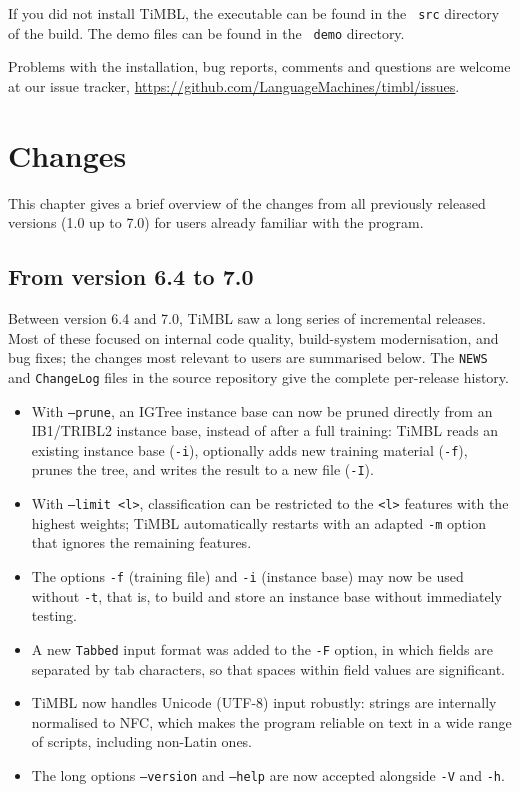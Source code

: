 \documentclass{book}
\begin{document}
If you did not install TiMBL, the executable can be found in the {\tt
  src} directory of the build. The demo files can be found in the {\tt
  demo} directory.

Problems with the installation, bug reports, comments and questions
are welcome at our issue tracker,
\url{https://github.com/LanguageMachines/timbl/issues}.

\chapter{Changes}
\label{changes}

This chapter gives a brief overview of the changes from all previously
released versions (1.0 up to 7.0) for users already familiar with the
program.

\section{From version 6.4 to 7.0}

Between version 6.4 and 7.0, TiMBL saw a long series of incremental
releases. Most of these focused on internal code quality, build-system
modernisation, and bug fixes; the changes most relevant to users are
summarised below. The {\tt NEWS} and {\tt ChangeLog} files in the
source repository give the complete per-release history.

\begin{itemize}
\item With {\tt --prune}, an IGTree instance base can now be pruned
  directly from an IB1/TRIBL2 instance base, instead of after a full
  training: TiMBL reads an existing instance base ({\tt -i}),
  optionally adds new training material ({\tt -f}), prunes the tree,
  and writes the result to a new file ({\tt -I}).
\item With {\tt --limit <l>}, classification can be restricted to the
  {\tt <l>} features with the highest weights; TiMBL automatically
  restarts with an adapted {\tt -m} option that ignores the remaining
  features.
\item The options {\tt -f} (training file) and {\tt -i} (instance
  base) may now be used without {\tt -t}, that is, to build and store
  an instance base without immediately testing.
\item A new {\tt Tabbed} input format was added to the {\tt -F}
  option, in which fields are separated by tab characters, so that
  spaces within field values are significant.
\item TiMBL now handles Unicode (UTF-8) input robustly: strings are
  internally normalised to NFC, which makes the program reliable on
  text in a wide range of scripts, including non-Latin ones.
\item The long options {\tt --version} and {\tt --help} are now
  accepted alongside {\tt -V} and {\tt -h}.
\end{itemize}
\end{document}
